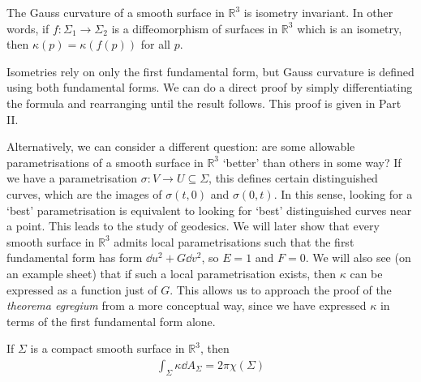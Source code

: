 \begin{theorem}
	The Gauss curvature of a smooth surface in $\mathbb R^3$ is isometry invariant.
	In other words, if $f \colon \Sigma_1 \to \Sigma_2$ is a diffeomorphism of surfaces in $\mathbb R^3$ which is an isometry, then $\kappa(p) = \kappa(f(p))$ for all $p$.
\end{theorem}
\begin{remark}
	Isometries rely on only the first fundamental form, but Gauss curvature is defined using both fundamental forms.
	We can do a direct proof by simply differentiating the formula and rearranging until the result follows.
	This proof is given in Part II.

	Alternatively, we can consider a different question: are some allowable parametrisations of a smooth surface in $\mathbb R^3$ `better' than others in some way?
	If we have a parametrisation $\sigma \colon V \to U \subseteq \Sigma$, this defines certain distinguished curves, which are the images of $\sigma(t,0)$ and $\sigma(0,t)$.
	In this sense, looking for a `best' parametrisation is equivalent to looking for `best' distinguished curves near a point.
	This leads to the study of geodesics.
	We will later show that every smooth surface in $\mathbb R^3$ admits local parametrisations such that the first fundamental form has form $\dd{u}^2 + G \dd{v}^2$, so $E = 1$ and $F = 0$.
	We will also see (on an example sheet) that if such a local parametrisation exists, then $\kappa$ can be expressed as a function just of $G$.
	This allows us to approach the proof of the \textit{theorema egregium} from a more conceptual way, since we have expressed $\kappa$ in terms of the first fundamental form alone.
\end{remark}
\begin{theorem}
	If $\Sigma$ is a compact smooth surface in $\mathbb R^3$, then
	\begin{align*}
		\int_\Sigma \kappa \dd{A_\Sigma} = 2 \pi \chi(\Sigma)
	\end{align*}
\end{theorem}
